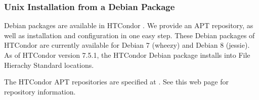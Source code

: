 \subsubsection{\label{sec:install-debs}
Unix Installation from a Debian Package}

Debian packages are available in HTCondor \VersionNotice.
We provide an APT repository, as well as 
installation and configuration in one easy step.
These Debian packages of HTCondor are currently available for 
Debian 7 (wheezy) and Debian 8 (jessie).
As of HTCondor version 7.5.1, 
the HTCondor Debian package installs into File Hierachy Standard locations.

The HTCondor APT repositories are specified at
  .
See this web page for repository information.

